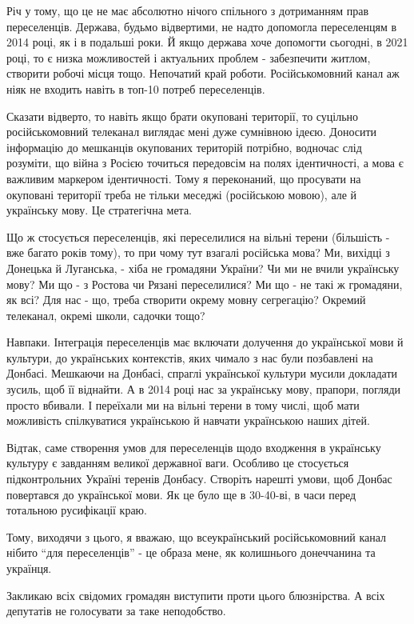 Річ у тому, що це не має абсолютно нічого спільного з дотриманням прав
переселенців. Держава, будьмо відвертими, не надто допомогла переселенцям в
2014 році, як і в подальші роки. Й якщо держава хоче допомогти сьогодні, в 2021
році, то є низка можливостей і актуальних проблем - забезпечити житлом,
створити робочі місця тощо. Непочатий край роботи. Російськомовний канал аж
ніяк не входить навіть в топ-10 потреб переселенців. 

Сказати відверто, то навіть якщо брати окуповані території, то суцільно
російськомовний телеканал виглядає мені дуже сумнівною ідеєю. Доносити
інформацію до мешканців окупованих територій потрібно, водночас слід розуміти,
що війна з Росією точиться передовсім на полях ідентичності, а мова є важливим
маркером ідентичності. Тому я переконаний, що просувати на окуповані території
треба не тільки меседжі (російською мовою), але й українську мову. Це
стратегічна мета. 

Що ж стосується переселенців, які переселилися на вільні терени (більшість -
вже багато років тому), то при чому тут взагалі російська мова? Ми, вихідці з
Донецька й Луганська, - хіба не громадяни України? Чи ми не вчили українську
мову? Ми що - з Ростова чи Рязані переселилися? Ми що - не такі ж громадяни, як
всі? Для нас - що, треба створити окрему мовну сегрегацію? Окремий телеканал,
окремі школи, садочки тощо? 

Навпаки. Інтеграція переселенців має включати долучення до української мови й
культури, до українських контекстів, яких чимало з нас були позбавлені на
Донбасі. Мешкаючи на Донбасі, спраглі української культури мусили докладати
зусиль, щоб її віднайти. А в 2014 році нас за українську мову, прапори, погляди
просто вбивали. І переїхали ми на вільні терени в тому числі, щоб мати
можливість спілкуватися українською й навчати українською наших дітей. 

Відтак, саме створення умов для переселенців щодо входження в українську
культуру є завданням великої державної ваги. Особливо це стосується
підконтрольних Україні теренів Донбасу. Створіть нарешті умови, щоб Донбас
повертався до української мови. Як це було ще в 30-40-ві, в часи перед
тотальною русифікації краю. 

Тому, виходячи з цього, я вважаю, що всеукраїнський російськомовний канал
нібито \enquote{для переселенців} - це образа мене, як колишнього донеччанина та
українця. 

Закликаю всіх свідомих громадян виступити проти цього блюзнірства. А всіх
депутатів не голосувати за таке неподобство.
